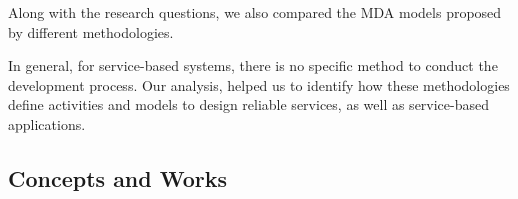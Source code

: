 
Along with the research questions, we also compared the MDA models 
proposed by different methodologies. 

In general, for service-based systems,
there is no specific method to conduct the development process. Our analysis, helped us to
identify how these methodologies define activities and models to design reliable
services, as well as service-based applications.

\subsection{Concepts and Works}
\label{subsec:methodology_concepts}

